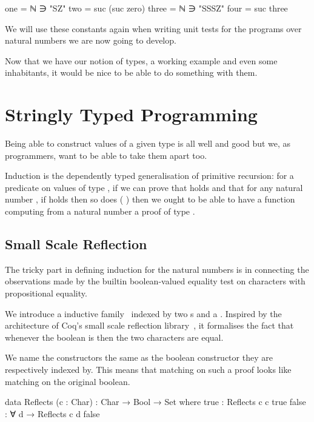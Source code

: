 \documentclass[twocolumn]{article}
\begin{document}
\label{sec:natconstant}
\begin{code}
one    = ℕ ∋ "SZ"
two    = suc (suc zero)
three  = ℕ ∋ "SSSZ"
four   = suc three
\end{code}

We will use these constants again when writing unit tests for the programs
over natural numbers we are now going to develop.

Now that we have our notion of types, a working example and even some
inhabitants, it would be nice to be able to do something with them.


\section{Stringly Typed Programming}

Being able to construct values of a given type is all well and good but
we, as programmers, want to be able to take them apart too.

Induction is the dependently typed generalisation of primitive recursion:
for a predicate  on values of type ,
if we can prove that { } holds
and that for any natural number , if { } holds
then so does { ( )}
then we ought to be able to have a function computing from a natural
number  a proof of type { }.

\subsection{Small Scale Reflection}

The tricky part in defining induction for the natural numbers is in
connecting the observations made by the builtin boolean-valued equality
test on characters \AF{\_==\_} with propositional equality.

We introduce a  inductive family~\cite{dybjer1994inductive}
indexed by two s and a . Inspired by the architecture of
Coq's small scale reflection library~\cite{assia_mahboubi_2021_4457887},
it formalises the fact that whenever the boolean is  then the two
characters are equal.

We name the  constructors the same as the boolean constructor
they are respectively indexed by. This means that matching on such a proof
looks like matching on the original boolean.

\begin{code}
data Reflects (c : Char) : Char → Bool → Set where
  true  : Reflects c c true
  false : ∀ {d} → Reflects c d false
\end{code}
\end{document}
